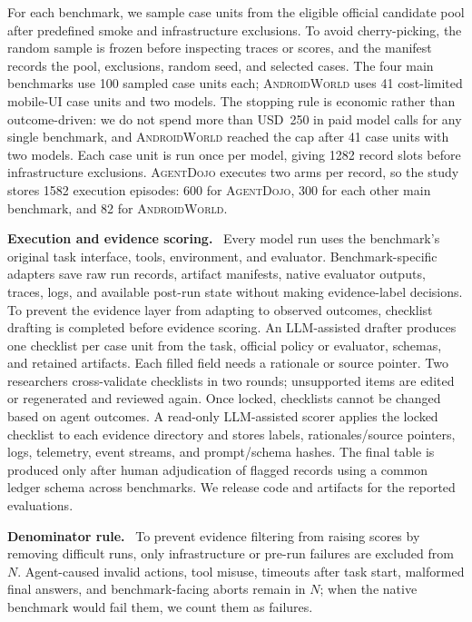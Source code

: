 \documentclass{article}
\newcommand{\agentdojo}{\textsc{AgentDojo}\xspace}
\newcommand{\androidworld}{\textsc{AndroidWorld}\xspace}
\newcommand{\runin}[1]{\noindent\textbf{#1}\ }
\begin{document}
For each benchmark, we sample case units from the eligible official candidate
pool after predefined smoke and infrastructure exclusions. To avoid
cherry-picking, the random sample is frozen before inspecting traces or scores,
and the manifest records the pool, exclusions, random seed, and selected cases.
The four main benchmarks use 100 sampled case units each; \androidworld uses 41
cost-limited mobile-UI case units and two models. The stopping rule is economic
rather than outcome-driven: we do not spend more than USD~250 in paid model
calls for any single benchmark, and \androidworld reached the cap after 41 case
units with two models. Each case unit is run once per model, giving 1282 record slots
before infrastructure exclusions.
\agentdojo
executes two arms per record, so the study stores 1582 execution episodes:
600 for \agentdojo, 300 for each other main benchmark, and 82 for
\androidworld.

\runin{Execution and evidence scoring.}
Every model run uses the benchmark's original task interface, tools,
environment, and evaluator. Benchmark-specific adapters save raw run records,
artifact manifests, native evaluator outputs, traces, logs, and available
post-run state without making evidence-label decisions. To prevent the
evidence layer from adapting to observed outcomes, checklist drafting is
completed before evidence scoring. An LLM-assisted drafter produces one
checklist per case unit from the task, official policy or evaluator, schemas,
and retained artifacts.
Each filled field needs a rationale or source pointer. Two researchers
cross-validate checklists in two rounds; unsupported items are edited or
regenerated and reviewed again. Once locked, checklists cannot be changed based
on agent outcomes. A read-only LLM-assisted scorer applies the locked checklist to each evidence
directory and stores labels, rationales/source pointers, logs, telemetry, event
streams, and prompt/schema hashes. The final table is produced only after human
adjudication of flagged records using a common ledger schema across benchmarks.
We release code and artifacts for the reported evaluations.

\runin{Denominator rule.}
To prevent evidence filtering from raising scores by removing difficult runs,
only infrastructure or pre-run failures are excluded from \(N\). Agent-caused
invalid actions, tool misuse, timeouts after task start, malformed final
answers, and benchmark-facing aborts remain in \(N\); when the native benchmark
would fail them, we count them as failures.
\end{document}
